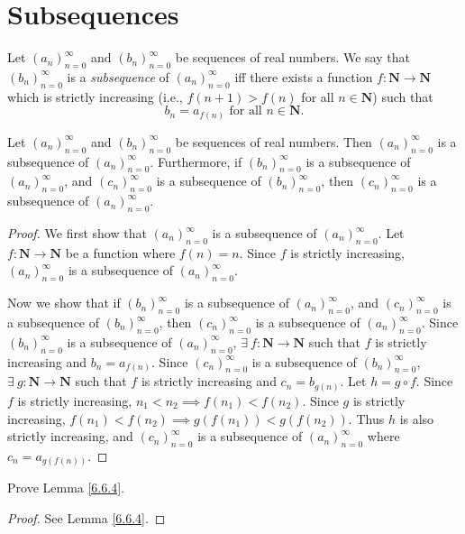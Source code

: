\section{Subsequences}\label{sec 6.6}

\begin{definition}[Subsequences]\label{6.6.1}
Let \((a_n)_{n = 0}^\infty\) and \((b_n)_{n = 0}^\infty\) be sequences of real numbers.
We say that \((b_n)_{n = 0}^\infty\) is a \emph{subsequence} of \((a_n)_{n = 0}^\infty\) iff there exists a function \(f : \mathbf{N} \to \mathbf{N}\) which is strictly increasing (i.e., \(f(n + 1) > f(n)\) for all \(n \in \mathbf{N}\)) such that
\[
    b_n = a_{f(n)} \text{ for all } n \in \mathbf{N}.
\]
\end{definition}

\setcounter{theorem}{3}
\begin{lemma}\label{6.6.4}
Let \((a_n)_{n = 0}^\infty\) and \((b_n)_{n = 0}^\infty\) be sequences of real numbers.
Then \((a_n)_{n = 0}^\infty\) is a subsequence of \((a_n)_{n = 0}^\infty\).
Furthermore, if \((b_n)_{n = 0}^\infty\) is a subsequence of \((a_n)_{n = 0}^\infty\), and \((c_n)_{n = 0}^\infty\) is a subsequence of \((b_n)_{n = 0}^\infty\), then \((c_n)_{n = 0}^\infty\) is a subsequence of \((a_n)_{n = 0}^\infty\).
\end{lemma}

\begin{proof}
We first show that \((a_n)_{n = 0}^\infty\) is a subsequence of \((a_n)_{n = 0}^\infty\).
Let \(f : \mathbf{N} \to \mathbf{N}\) be a function where \(f(n) = n\).
Since \(f\) is strictly increasing, \((a_n)_{n = 0}^\infty\) is a subsequence of \((a_n)_{n = 0}^\infty\).

Now we show that if \((b_n)_{n = 0}^\infty\) is a subsequence of \((a_n)_{n = 0}^\infty\), and \((c_n)_{n = 0}^\infty\) is a subsequence of \((b_n)_{n = 0}^\infty\), then \((c_n)_{n = 0}^\infty\) is a subsequence of \((a_n)_{n = 0}^\infty\).
Since \((b_n)_{n = 0}^\infty\) is a subsequence of \((a_n)_{n = 0}^\infty\), \(\exists\ f : \mathbf{N} \to \mathbf{N}\) such that \(f\) is strictly increasing and \(b_n = a_{f(n)}\).
Since \((c_n)_{n = 0}^\infty\) is a subsequence of \((b_n)_{n = 0}^\infty\), \(\exists\ g : \mathbf{N} \to \mathbf{N}\) such that \(f\) is strictly increasing and \(c_n = b_{g(n)}\).
Let \(h = g \circ f\).
Since \(f\) is strictly increasing, \(n_1 < n_2 \implies f(n_1) < f(n_2)\).
Since \(g\) is strictly increasing, \(f(n_1) < f(n_2) \implies g(f(n_1)) < g(f(n_2))\).
Thus \(h\) is also strictly increasing, and \((c_n)_{n = 0}^\infty\) is a subsequence of \((a_n)_{n = 0}^\infty\) where \(c_n = a_{g(f(n))}\).
\end{proof}

\exercisesection

\begin{exercise}\label{6.6.1}
Prove Lemma \ref{6.6.4}.
\end{exercise}

\begin{proof}
See Lemma \ref{6.6.4}.
\end{proof}